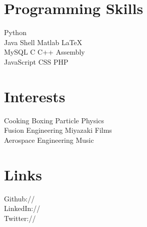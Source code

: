 \documentclass[]{deedy-resume-openfont}
\begin{document}
\begin{minipage}[t]{0.42\textwidth}
    \section{Programming Skills}
        Python \\
        Java \textbullet{}
        Shell \textbullet{}
        Matlab \textbullet{}
        \LaTeX\ \\
        MySQL \textbullet{}
        C \textbullet{}
        C++ \textbullet{}
        Assembly \\
        JavaScript \textbullet{}
        CSS \textbullet{}
        PHP \\
\end{minipage}
\hfill
\begin{minipage}[t]{0.35\textwidth}
    \section{Interests}
        Cooking \textbullet{}
        Boxing \textbullet{}
        Particle Physics \\
        Fusion Engineering \textbullet{}
        Miyazaki Films \\
        Aerospace Engineering \textbullet{}
        Music 
\end{minipage}
\hfill
\begin{minipage}[t]{0.22\textwidth}
    \section{Links}
        Github:// \href{https://github.com/paulkiernan}{}\\
        LinkedIn:// \href{https://www.linkedin.com/pub/paul-kiernan/24/a32/470}{}\\
        Twitter:// \href{https://twitter.com/gaelic}{}\\
\end{minipage}
\end{document}
